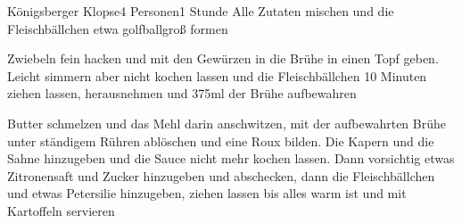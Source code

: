 
\begin{recipe}{Königsberger Klopse}{4 Personen}{1 Stunde}
Alle Zutaten mischen und die Fleischbällchen etwa golfballgroß formen

Zwiebeln fein hacken und mit den Gewürzen in die Brühe  in einen Topf geben.
Leicht simmern aber nicht kochen lassen und die Fleischbällchen 10 Minuten ziehen lassen, herausnehmen und 375ml der Brühe aufbewahren

Butter schmelzen und das Mehl darin anschwitzen, mit der aufbewahrten Brühe unter ständigem Rühren ablöschen und eine Roux bilden. Die Kapern und die Sahne hinzugeben und die Sauce nicht mehr kochen lassen. Dann vorsichtig etwas Zitronensaft und Zucker hinzugeben und abschecken, dann die Fleischbällchen und etwas Petersilie hinzugeben, ziehen lassen bis alles warm ist und mit Kartoffeln servieren
\end{recipe}


